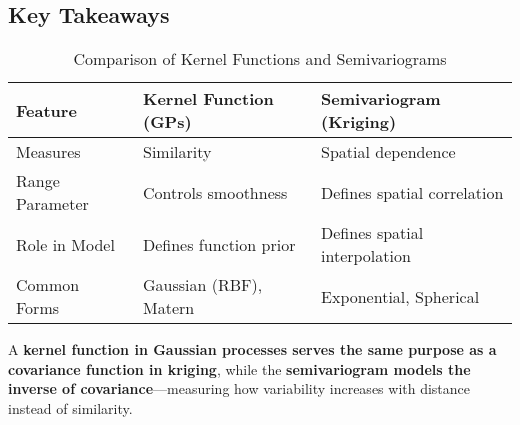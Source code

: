 \documentclass{article}
\begin{document}
\subsection{Key Takeaways}
\begin{table}[h]
    \centering
    \begin{tabular}{|l|l|l|}
        \hline
        \textbf{Feature} & \textbf{Kernel Function (GPs)} & \textbf{Semivariogram (Kriging)} \\
        \hline
        Measures & Similarity & Spatial dependence \\
        \hline
        Range Parameter & Controls smoothness & Defines spatial correlation \\
        \hline
        Role in Model & Defines function prior & Defines spatial interpolation \\
        \hline
        Common Forms & Gaussian (RBF), Matern & Exponential, Spherical \\
        \hline
    \end{tabular}
    \caption{Comparison of Kernel Functions and Semivariograms}
\end{table}

\noindent A \textbf{kernel function in Gaussian processes serves the same purpose as a covariance function in kriging}, while the \textbf{semivariogram models the inverse of covariance}—measuring how variability increases with distance instead of similarity.
\end{document}
